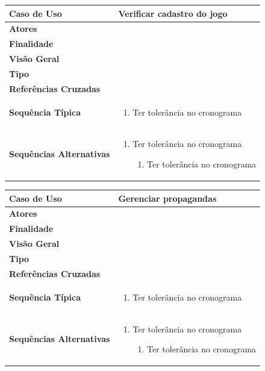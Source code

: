 \documentclass[a4paper,11pt]{article}
\begin{document}
\begin{table}[H]
		\begin{tabularx}{\textwidth}{|l|X|}
		\hline
			\textbf{Caso de Uso} &  Verificar cadastro do jogo \\ \hline
			\textbf{Atores} &    \\ \hline
			\textbf{Finalidade} &   \\ \hline
			\textbf{Visão Geral} &  \\ \hline
			\textbf{Tipo} &  \\ \hline
			\textbf{Referências Cruzadas} &  \\ \hline
			\textbf{Sequência Típica} & 
			\begin{enumerate}
			\item Ter tolerância no cronograma
			\end{enumerate} \\ \hline
			\textbf{Sequências Alternativas} & 
			\begin{enumerate}
			\item Ter tolerância no cronograma
			\begin{enumerate}
			\item Ter tolerância no cronograma
			\end{enumerate}
			\end{enumerate} \\ \hline
		\end{tabularx}
\end{table}

\begin{table}[H]
		\begin{tabularx}{\textwidth}{|l|X|}
		\hline
			\textbf{Caso de Uso} &  Gerenciar propagandas \\ \hline
			\textbf{Atores} &    \\ \hline
			\textbf{Finalidade} &   \\ \hline
			\textbf{Visão Geral} &  \\ \hline
			\textbf{Tipo} &  \\ \hline
			\textbf{Referências Cruzadas} &  \\ \hline
			\textbf{Sequência Típica} & 
			\begin{enumerate}
			\item Ter tolerância no cronograma
			\end{enumerate} \\ \hline
			\textbf{Sequências Alternativas} & 
			\begin{enumerate}
			\item Ter tolerância no cronograma
			\begin{enumerate}
			\item Ter tolerância no cronograma
			\end{enumerate}
			\end{enumerate} \\ \hline
		\end{tabularx}
\end{table}
\end{document}
